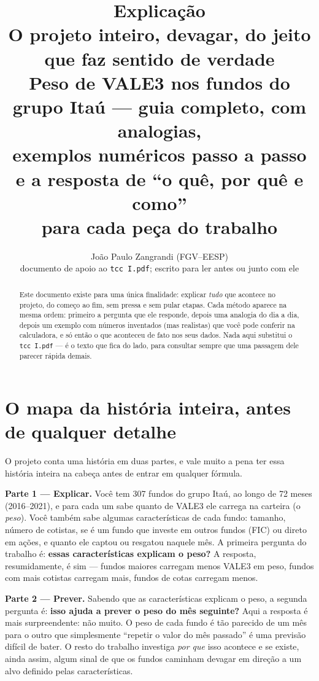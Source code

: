 \documentclass[11pt,a4paper]{article}
\title{\textbf{Explicação}\\[8pt]
\Large O projeto inteiro, devagar, do jeito que faz sentido de verdade\\[4pt]
\normalsize Peso de VALE3 nos fundos do grupo Itaú --- guia completo, com analogias,\\
exemplos numéricos passo a passo e a resposta de ``o quê, por quê e como''\\
para cada peça do trabalho}
\author{João Paulo Zangrandi (FGV--EESP)\\[2pt]\small documento de apoio ao \texttt{tcc I.pdf}; escrito para ler antes ou junto com ele}
\date{}
\begin{document}
\maketitle

\begin{abstract}
\noindent Este documento existe para uma única finalidade: explicar \emph{tudo} que acontece no
projeto, do começo ao fim, sem pressa e sem pular etapas. Cada método aparece na mesma ordem:
primeiro a pergunta que ele responde, depois uma analogia do dia a dia, depois um exemplo com
números inventados (mas realistas) que você pode conferir na calculadora, e só então o que
aconteceu de fato nos seus dados. Nada aqui substitui o \texttt{tcc I.pdf} --- é o texto que fica
do lado, para consultar sempre que uma passagem dele parecer rápida demais.
\end{abstract}

\newpage
\tableofcontents
\newpage

\section{O mapa da história inteira, antes de qualquer detalhe}

O projeto conta uma história em duas partes, e vale muito a pena ter essa história inteira na
cabeça antes de entrar em qualquer fórmula.

\textbf{Parte 1 --- Explicar.} Você tem 307 fundos do grupo Itaú, ao longo de 72 meses
(2016--2021), e para cada um sabe quanto de VALE3 ele carrega na carteira (o \emph{peso}). Você
também sabe algumas características de cada fundo: tamanho, número de cotistas, se é um fundo
que investe em outros fundos (FIC) ou direto em ações, e quanto ele captou ou resgatou naquele
mês. A primeira pergunta do trabalho é: \textbf{essas características explicam o peso?} A
resposta, resumidamente, é sim --- fundos maiores carregam menos VALE3 em peso, fundos com mais
cotistas carregam mais, fundos de cotas carregam menos.

\textbf{Parte 2 --- Prever.} Sabendo que as características explicam o peso, a segunda pergunta
é: \textbf{isso ajuda a prever o peso do mês seguinte?} Aqui a resposta é mais surpreendente:
não muito. O peso de cada fundo é tão parecido de um mês para o outro que simplesmente
``repetir o valor do mês passado'' é uma previsão difícil de bater. O resto do trabalho
investiga \emph{por que} isso acontece e se existe, ainda assim, algum sinal de que os fundos
caminham devagar em direção a um alvo definido pelas características.
\end{document}
